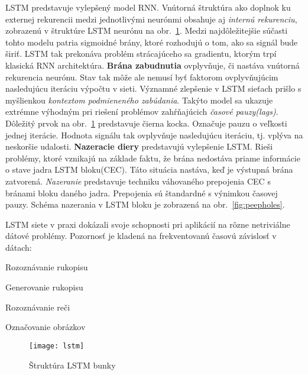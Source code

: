 LSTM predstavuje vylepšený model RNN. Vnútorná štruktúra ako doplnok ku externej rekurencii medzi jednotlivými neurónmi obsahuje aj \textit{internú rekurenciu}, zobrazenú v štruktúre LSTM neurónu na obr.~\ref{fig:lstm}. Medzi najdôležitejšie súčasti tohto modelu patria sigmoidné brány, ktoré rozhodujú o tom, ako sa signál bude širiť. LSTM tak prekonáva problém strácajúceho sa gradientu, ktorým trpí klasická RNN architektúra.
\newline
\textbf{Brána zabudnutia} ovplyvňuje, či nastáva vnútorná rekurencia neurónu. Stav tak môže ale nemusí byť faktorom ovplyvňujúcim nasledujúcu iteráciu výpočtu v sieti. Významné zlepšenie v LSTM sieťach prišlo s myšlienkou \textit{kontextom podmieneného zabúdania}. Takýto model sa ukazuje extrémne výhodným pri riešení problémov zahŕňajúcich \textit{časové pauzy(lags)}.
 Dôležitý prvok  na obr.~\ref{fig:lstm} predstavuje čierna kocka. Označuje pauzu o veľkosti jednej iterácie. Hodnota signálu tak ovplyvňuje nasledujúcu iteráciu, tj. vplýva na neskoršie udalosti.
\newline
\noindent
\textbf{Nazeracie diery} predstavujú vylepšenie LSTM. Rieši problémy, ktoré vznikajú na základe faktu, že brána nedostáva priame informácie o stave jadra LSTM bloku(CEC). Táto situácia nastáva, keď je výstupná brána zatvorená. \textit{Nazeranie} predstavuje techniku váhovaného prepojenia CEC s bránami bloku daného jadra. Prepojenia sú štandardné s výnimkou časovej pauzy. Schéma nazerania v LSTM bloku je zobrazená na obr.~\ref{fig:peepholes}.

LSTM siete v praxi dokázali svoje schopnosti pri aplikácií na rôzne netriviálne dátové problémy. Pozornosť je kladená na frekventovanú časovú závislosť v dátach:
\begin{my_itemize}
	\item{Rozoznávanie rukopisu}
	\item{Generovanie rukopisu}
	\item{Rozoznávanie reči}
	\item{Označovanie obrázkov}
\end{my_itemize}

\begin{figure}[H]
\begin{center}
\texttt{[image: lstm]}\end{center}
\caption[lstm]{Štruktúra LSTM bunky}\label{fig:lstm}
\end{figure}

